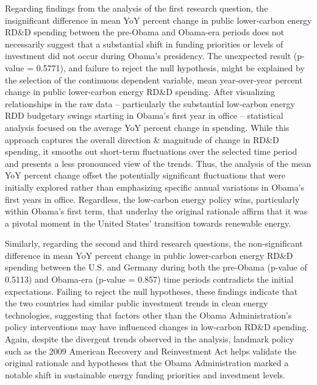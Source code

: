 \documentclass[
  12pt,
]{article}
\begin{document}
Regarding findings from the analysis of the first research question, the
insignificant difference in mean YoY percent change in public
lower-carbon energy RD\&D spending between the pre-Obama and Obama-era
periods does not necessarily suggest that a substantial shift in funding
priorities or levels of investment did not occur during Obama's
presidency. The unexpected result (p-value = 0.5771), and failure to
reject the null hypothesis, might be explained by the selection of the
continuous dependent variable, mean year-over-year percent change in
public lower-carbon energy RD\&D spending. After visualizing
relationships in the raw data -- particularly the substantial low-carbon
energy RDD budgetary swings starting in Obama's first year in office --
statistical analysis focused on the average YoY percent change in
spending. While this approach captures the overall direction \&
magnitude of change in RD\&D spending, it smooths out short-term
fluctuations over the selected time period and presents a less
pronounced view of the trends. Thus, the analysis of the mean YoY
percent change offset the potentially significant fluctuations that were
initially explored rather than emphasizing specific annual variations in
Obama's first years in office. Regardless, the low-carbon energy policy
wins, particularly within Obama's first term, that underlay the original
rationale affirm that it was a pivotal moment in the United States'
transition towards renewable energy.

Similarly, regarding the second and third research questions, the
non-significant difference in mean YoY percent change in public
lower-carbon energy RD\&D spending between the U.S. and Germany during
both the pre-Obama (p-value of 0.5113) and Obama-era (p-value = 0.857)
time periods contradicts the initial expectations. Failing to reject the
null hypotheses, these findings indicate that the two countries had
similar public investment trends in clean energy technologies,
suggesting that factors other than the Obama Administration's policy
interventions may have influenced changes in low-carbon RD\&D spending.
Again, despite the divergent trends observed in the analysis, landmark
policy such as the 2009 American Recovery and Reinvestment Act helps
validate the original rationale and hypotheses that the Obama
Administration marked a notable shift in sustainable energy funding
priorities and investment levels.
\end{document}

